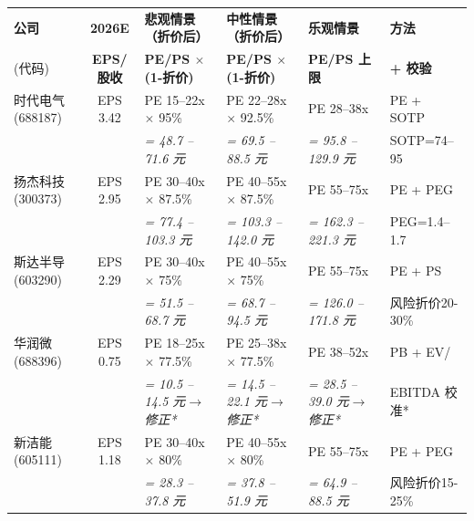 \begin{exhibitbox}
\centering
\scriptsize
\setlength{\tabcolsep}{2pt}
\begin{tabularx}{\textwidth}{>{\hsize=0.85\hsize}X c >{\hsize=1.1\hsize}X >{\hsize=1.15\hsize}X >{\hsize=1.15\hsize}X >{\hsize=1.0\hsize}X}
\toprule
\centering\textbf{公司} & \textbf{2026E} & \textbf{悲观情景（折价后）} & \textbf{中性情景（折价后）} & \textbf{乐观情景} & \textbf{方法} \\
\centering (代码) & \textbf{EPS/股收} & \textbf{PE/PS $\times$ (1-折价)} & \textbf{PE/PS $\times$ (1-折价)} & \textbf{PE/PS 上限} & \textbf{+ 校验} \\
\midrule
\rowcolor{riskgreen!5}
\centering 时代电气 \newline \scriptsize(688187) & EPS 3.42 & PE 15–22x $\times$ 95\% & PE 22–28x $\times$ 92.5\% & PE 28–38x & PE + SOTP \\
& & \textit{= 48.7 – 71.6 元} & \textit{= 69.5 – 88.5 元} & \textit{= 95.8 – 129.9 元} & SOTP=74–95 \\
\midrule
\rowcolor{riskgreen!5}
\centering 扬杰科技 \newline \scriptsize(300373) & EPS 2.95 & PE 30–40x $\times$ 87.5\% & PE 40–55x $\times$ 87.5\% & PE 55–75x & PE + PEG \\
& & \textit{= 77.4 – 103.3 元} & \textit{= 103.3 – 142.0 元} & \textit{= 162.3 – 221.3 元} & PEG=1.4–1.7 \\
\midrule
\rowcolor{accentblue!5}
\centering 斯达半导 \newline \scriptsize(603290) & EPS 2.29 & PE 30–40x $\times$ 75\% & PE 40–55x $\times$ 75\% & PE 55–75x & PE + PS \\
& & \textit{= 51.5 – 68.7 元} & \textit{= 68.7 – 94.5 元} & \textit{= 126.0 – 171.8 元} & 风险折价20-30\% \\
\midrule
\rowcolor{accentblue!5}
\centering 华润微 \newline \scriptsize(688396) & EPS 0.75 & PE 18–25x $\times$ 77.5\% & PE 25–38x $\times$ 77.5\% & PE 38–52x & PB + EV/ \\
& & \textit{= 10.5 – 14.5 元$\to$修正*} & \textit{= 14.5 – 22.1 元$\to$修正*} & \textit{= 28.5 – 39.0 元$\to$修正*} & EBITDA 校准* \\
\midrule
\rowcolor{accentblue!5}
\centering 新洁能 \newline \scriptsize(605111) & EPS 1.18 & PE 30–40x $\times$ 80\% & PE 40–55x $\times$ 80\% & PE 55–75x & PE + PEG \\
& & \textit{= 28.3 – 37.8 元} & \textit{= 37.8 – 51.9 元} & \textit{= 64.9 – 88.5 元} & 风险折价15-25\% \\

\end{tabularx}
\end{exhibitbox}
